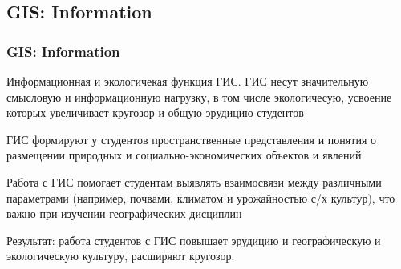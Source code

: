 \documentclass[pdflatex,compress,8pt,
	xcolor={dvipsnames,dvipsnames,svgnames,x11names,table},
	hyperref={	 
	pdfauthor={Lemenkova Polina}, 
	pdfsubject={Preentation}, 
	pdfcreator={Lemenkova Polina}, 
	pdfproducer={Lemenkova Polina}, 
	colorlinks=true,
	linkcolor=Red3, 
	citecolor=NavyBlue, 
	urlcolor = NavyBlue, 
	breaklinks = true}]{beamer}
\begin{document}
\subsection{GIS: Information}
\begin{frame}\frametitle{GIS: Information}

\begin{alertblock}{}
Информационная и экологичекая функция ГИС. ГИС несут значительную смысловую и информационную нагрузку, в том числе экологичесую, усвоение которых увеличивает кругозор и общую эрудицию студентов 
\end{alertblock}

\begin{block}{}
ГИС формируют у студентов пространственные представления и понятия о размещении природных и социально-экономических объектов и явлений
\end{block}

\begin{figure}[H]
	\centering
			\hspace{5mm}
\end{figure}

\begin{alertblock}{}
Работа с ГИС помогает студентам выявлять взаимосвязи между различными параметрами (например, почвами, климатом и урожайностью с/х культур), что важно при изучении географических дисциплин
\end{alertblock}

\begin{block}{}
Результат: работа студентов с ГИС повышает эрудицию и географическую и экологическую культуру, 
расширяют кругозор.
\end{block}

\end{frame}
\end{document}
